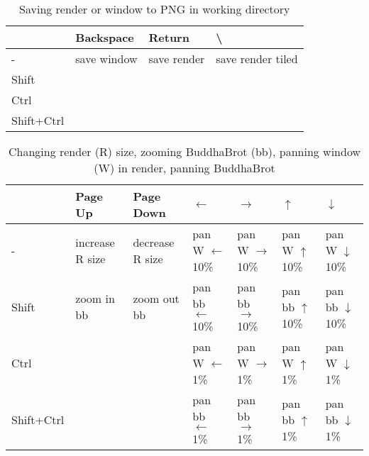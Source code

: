 \documentclass[10pt,a4paper]{article}
\begin{document}
\begin{table}[h!]
    \caption{Saving render or window to PNG in working directory}
    \setlength{\tabcolsep}{0.0pt}
    \begin{tabularx}{\linewidth}{LLLL}
        \toprule
                   & Backspace   & Return      & \textbackslash    \\
        \midrule                                                
        -          & save window & save render & save render tiled \\
        Shift      &             &             &                   \\
        Ctrl       &             &             &                   \\
        Shift+Ctrl &             &             &                   \\
        \bottomrule
    \end{tabularx}
\end{table}

\begin{table}[h!]
    \caption{Changing render (R) size, zooming BuddhaBrot (bb), panning window (W) in render, panning BuddhaBrot}
    \setlength{\tabcolsep}{0.0pt}
    \begin{tabularx}{\linewidth}{LLLLLLL}
        \toprule
                   & Page Up         & Page Down       & $\leftarrow$             & $\rightarrow$              & $\uparrow$             & $\downarrow$             \\
        \midrule                                                                                                                                                 
        -          & increase R size & decrease R size & pan W $\leftarrow$ 10\%  & pan W  $\rightarrow$ 10\%  & pan W $\uparrow$ 10\%  & pan W $\downarrow$ 10\%  \\
        Shift      & zoom in bb      & zoom out bb     & pan bb $\leftarrow$ 10\% & pan bb  $\rightarrow$ 10\% & pan bb $\uparrow$ 10\% & pan bb $\downarrow$ 10\% \\
        Ctrl       &                 &                 & pan W $\leftarrow$ 1\%   & pan W  $\rightarrow$ 1\%   & pan W $\uparrow$ 1\%   & pan W $\downarrow$ 1\%   \\
        Shift+Ctrl &                 &                 & pan bb $\leftarrow$ 1\%  & pan bb  $\rightarrow$ 1\%  & pan bb $\uparrow$ 1\%  & pan bb $\downarrow$ 1\%  \\
        \bottomrule
    \end{tabularx}
\end{table}
\end{document}
